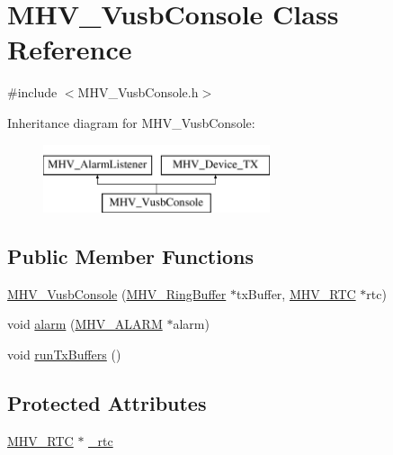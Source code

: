 \hypertarget{class_m_h_v___vusb_console}{
\section{\-M\-H\-V\-\_\-\-Vusb\-Console \-Class \-Reference}
\label{class_m_h_v___vusb_console}
}


{\ttfamily \#include $<$\-M\-H\-V\-\_\-\-Vusb\-Console.\-h$>$}

\-Inheritance diagram for \-M\-H\-V\-\_\-\-Vusb\-Console\-:\begin{figure}[H]
\begin{center}
\leavevmode
\includegraphics[height=2.000000cm]{class_m_h_v___vusb_console}
\end{center}
\end{figure}
\subsection*{\-Public \-Member \-Functions}
\begin{DoxyCompactItemize}
\item 
\hyperlink{class_m_h_v___vusb_console_a2ad2bc9f11e009fd7f653b998e732524}{\-M\-H\-V\-\_\-\-Vusb\-Console} (\hyperlink{class_m_h_v___ring_buffer}{\-M\-H\-V\-\_\-\-Ring\-Buffer} $\ast$tx\-Buffer, \hyperlink{class_m_h_v___r_t_c}{\-M\-H\-V\-\_\-\-R\-T\-C} $\ast$rtc)
\item 
void \hyperlink{class_m_h_v___vusb_console_a686f9fdcdf6884351996e9adc1fa6114}{alarm} (\hyperlink{_m_h_v___r_t_c_8h_af13307658f41fba330ffae04dd5cbce6}{\-M\-H\-V\-\_\-\-A\-L\-A\-R\-M} $\ast$alarm)
\item 
void \hyperlink{class_m_h_v___vusb_console_a00956c69813f5a0cbdf0a5cb0555bbbf}{run\-Tx\-Buffers} ()
\end{DoxyCompactItemize}
\subsection*{\-Protected \-Attributes}
\begin{DoxyCompactItemize}
\item 
\hyperlink{class_m_h_v___r_t_c}{\-M\-H\-V\-\_\-\-R\-T\-C} $\ast$ \hyperlink{class_m_h_v___vusb_console_a185c110b91f513e6588534b0e8a0a221}{\-\_\-rtc}
\end{DoxyCompactItemize}


